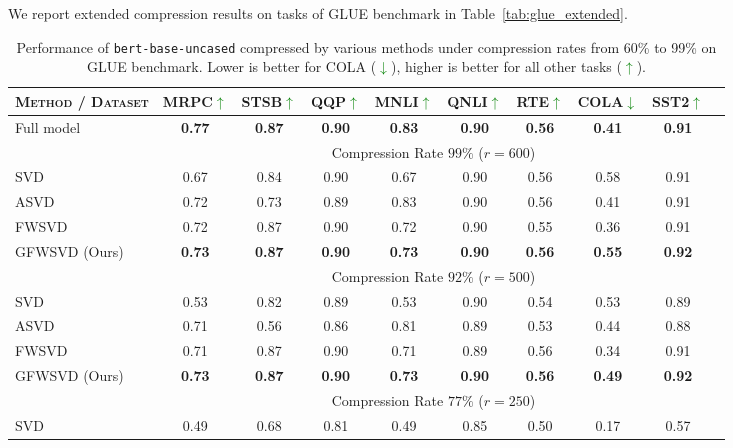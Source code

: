 \documentclass{article}
\begin{document}
We report extended compression results on tasks of GLUE benchmark in Table~\ref{tab:glue_extended}.

\begin{table}[htbp]
\centering
\caption{Performance of \texttt{bert-base-uncased} compressed by various methods under compression rates from 60\% to 99\% on GLUE benchmark. Lower is better for COLA (\textcolor{green}{$\downarrow$}), higher is better for all other tasks (\textcolor{green}{$\uparrow$}).}
\footnotesize
\begin{tabular}{l|ccccccccc}
\toprule
\textsc{Method / Dataset} & MRPC\textcolor{green}{$\uparrow$} & STSB\textcolor{green}{$\uparrow$} & QQP\textcolor{green}{$\uparrow$} & MNLI\textcolor{green}{$\uparrow$} & QNLI\textcolor{green}{$\uparrow$} & RTE\textcolor{green}{$\uparrow$} & COLA\textcolor{green}{$\downarrow$} & SST2\textcolor{green}{$\uparrow$} \\
\midrule
Full model & \textbf{0.77} & \textbf{0.87} & \textbf{0.90} & \textbf{0.83} & \textbf{0.90} & \textbf{0.56} & \textbf{0.41} & \textbf{0.91} \\
\midrule
& \multicolumn{8}{c}{Compression Rate $99\%$ ($r=600$)} \\
\midrule
SVD & 0.67 & 0.84 & 0.90 & 0.67 & 0.90 & 0.56 & 0.58 & 0.91 \\
ASVD~\cite{asvd} & 0.72 & 0.73 & 0.89 & 0.83 & 0.90 & 0.56 & 0.41 & 0.91 \\
FWSVD~\cite{FWSVD} & 0.72 & 0.87 & 0.90 & 0.72 & 0.90 & 0.55 & 0.36 & 0.91 \\
GFWSVD (Ours) & \textbf{0.73} & \textbf{0.87} & \textbf{0.90} & \textbf{0.73} & \textbf{0.90} & \textbf{0.56} & \textbf{0.55} & \textbf{0.92} \\
\midrule
& \multicolumn{8}{c}{Compression Rate $92\%$ ($r=500$)} \\
\midrule
SVD & 0.53 & 0.82 & 0.89 & 0.53 & 0.90 & 0.54 & 0.53 & 0.89 \\
ASVD~\cite{asvd} & 0.71 & 0.56 & 0.86 & 0.81 & 0.89 & 0.53 & 0.44 & 0.88 \\
FWSVD~\cite{FWSVD} & 0.71 & 0.87 & 0.90 & 0.71 & 0.89 & 0.56 & 0.34 & 0.91 \\
GFWSVD (Ours) & \textbf{0.73} & \textbf{0.87} & \textbf{0.90} & \textbf{0.73} & \textbf{0.90} & \textbf{0.56} & \textbf{0.49} & \textbf{0.92} \\
\midrule
& \multicolumn{8}{c}{Compression Rate $77\%$ ($r=250$)} \\
\midrule
SVD & 0.49 & 0.68 & 0.81 & 0.49 & 0.85 & 0.50 & 0.17 & 0.57 \\

\end{tabular}
\end{table}
\end{document}

